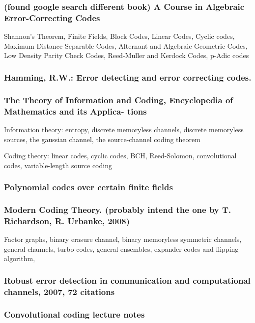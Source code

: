 \documentclass{article}
\begin{document}
\subsubsection{(found google search different book) A Course in Algebraic Error-Correcting Codes}

Shannon's Theorem, Finite Fields, Block Codes, Linear Codes, Cyclic codes, Maximum Distance Separable Codes, Alternant and Algebraic Geometric Codes, Low Density Parity Check Codes, Reed-Muller and Kerdock Codes, p-Adic codes

\subsubsection{Hamming, R.W.: Error detecting and error correcting codes.}

\subsubsection{The Theory of Information and Coding, Encyclopedia of Mathematics and its Applica-
tions}

Information theory: entropy, discrete memoryless channels, discrete memoryless sources, the gaussian channel, the source-channel coding theorem

Coding theory: linear codes, cyclic codes, BCH, Reed-Solomon, convolutional codes, variable-length source coding

\subsubsection{Polynomial codes over certain finite fields}

\subsubsection{Modern Coding Theory. (probably intend the one by T. Richardson, R. Urbanke, 2008)}

Factor graphs, binary erasure channel, binary memoryless symmetric channels, general channels, turbo codes, general ensembles, expander codes and flipping algorithm,

\subsubsection{Robust error detection in communication and computational channels, 2007, 72 citations}

\subsubsection{Convolutional coding lecture notes}
\end{document}
